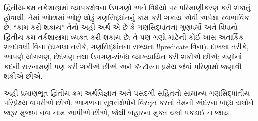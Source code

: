 \documentclass[../../../include/open-logic-section]{subfiles}
\begin{document}


દ્વિતીય-ક્રમ તર્કશાસ્ત્રમાં વ્યાપકક્ષેત્રના ઉપગણો અને વિધેયો પર
પરિમાણીકરણ કરી શકાતું હોવાથી, તેમાં ઓછામાં ઓછું થોડું ગણસિદ્ધાંતનું
કામ કરી શકાય એવી અપેક્ષા સ્વાભાવિક છે. ``કામ કરી શકાય'' તેનો અહીં
અર્થ એ છે કે ગણસિદ્ધાંતના ગુણધર્મો અને વિધાનો દ્વિતીય-ક્રમ
તર્કશાસ્ત્રમાં વ્યક્ત કરી શકાય છે; તે પણ ગણો માટેની કોઈ ખાસ
અતાર્કિક શબ્દાવલી વિના (દાખલા તરીકે, ગણસિદ્ધાંતના સભ્યતા
!!{predicate} વિના). દાખલા તરીકે, આપણે યોગગણ, છેદગણ તથા
ઉપગણ-સંબંધ વ્યાખ્યાયિત કરી શકીએ છીએ; ગણોનાં કદની સરખામણી પણ કરી
શકીએ છીએ અને કૅન્ટૉરના પ્રમેય જેવાં પરિણામો જણાવી શકીએ છીએ.

અહીં પ્રમાણભૂત દ્વિતીય-ક્રમ અર્થવિજ્ઞાન અને પસંદગી સહિતનો સામાન્ય
ગણસિદ્ધાંતીય પરિપ્રેક્ષ્ય વાપરીએ છીએ. આગળના સૂત્રસંક્ષેપોને
વિસ્તૃત કરતાં તેમની અંદરના બદ્ધ ચલોને જરૂર મુજબ નવા નામ આપીએ
છીએ, જેથી બહારના મુક્ત ચલો પકડાઈ ન જાય.
\end{document}
